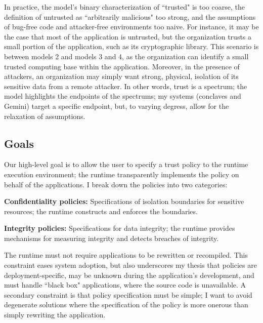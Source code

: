 In practice, the model's binary characterization of ``trusted" is too coarse,
the definition of untrusted as ``arbitrarily malicious" too strong,
and the assumptions of bug-free code and attacker-free environments too
naive.
%
For instance, it may be the case that most of the application is untrusted, but
the organization trusts a small portion of the application, such as its
cryptographic library.
%
This scenario is between models 2 and models 3 and 4, as the organization can
identify a small trusted computing base within the application.
%
Moreover, in the presence of attackers, an organization may simply
want strong, physical, isolation of its sensitive data from a remote attacker.
%
In other words, trust is a spectrum; the model highlights the endpoints of the
spectrums; my systems (conclaves and Gemini) target a specific endpoint, but,
to varying degress, allow for the relaxation of assumptions.



\subsection{Goals}

Our high-level goal is to allow the user to specify a trust policy to the
runtime execution environment; the runtime transparently implements the
policy on behalf of the applications.
%
I break down the policies into two categories:

\begin{widelist}
\item \textbf{Confidentiality policies:} Specifications of isolation boundaries for
    sensitive resources; the runtime constructs and enforces the boundaries.

\item \textbf{Integrity policies:} Specifications for data integrity; the runtime
    provides mechanisms for measuring integrity and detects breaches of
    integrity.
\end{widelist}


%
The runtime must not require applications to be rewritten or recompiled.
%
This constraint eases system adoption, but also underscores my
thesis that policies are deployment-specific, may be unknown during the
application's development, and must handle ``black box" applications, where the
source code is unavailable.
%
A secondary constraint is that policy specification  must be simple; I want to avoid
degenerate solutions where the specification of the policy is more
onerous than simply rewriting the application.


